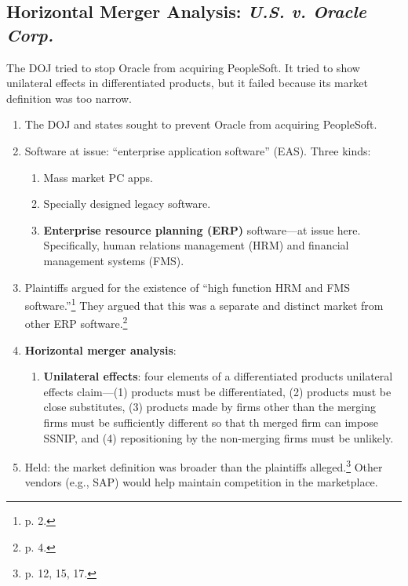 \subsection{Horizontal Merger Analysis: \emph{U.S. v. Oracle Corp.}}

The DOJ tried to stop Oracle from acquiring PeopleSoft. It tried to show 
unilateral effects in differentiated products, but it failed because its 
market definition was too narrow.

\begin{enumerate}
    \item The DOJ and states sought to prevent Oracle from acquiring 
    PeopleSoft.
    \item Software at issue: ``enterprise application software'' (EAS). Three 
    kinds:
    \begin{enumerate}
        \item Mass market PC apps.
        \item Specially designed legacy software.
        \item \textbf{Enterprise resource planning (ERP)} software---at issue 
        here. Specifically, human relations management (HRM) and financial 
        management systems (FMS).
    \end{enumerate}
    \item Plaintiffs argued for the existence of ``high function HRM and FMS 
    software.''\footnote{p. 2.} They argued that this was a separate and 
    distinct market from other ERP software.\footnote{p. 4.}
    \item \textbf{Horizontal merger analysis}:
    \begin{enumerate}
        \label{oracle-unilateral-effects}
        \item \textbf{Unilateral effects}: four elements of a differentiated 
        products unilateral effects claim---(1) products must be 
        differentiated, (2) products must be close substitutes, (3) products 
        made by firms other than the merging firms must be sufficiently 
        different so that th merged firm can impose SSNIP, and (4) 
        repositioning by the non-merging firms must be unlikely.
    \end{enumerate}
    \item Held: the market definition was broader than the plaintiffs 
    alleged.\footnote{p. 12, 15, 17.} Other vendors (e.g., SAP) would help 
    maintain competition in the marketplace.
\end{enumerate}


